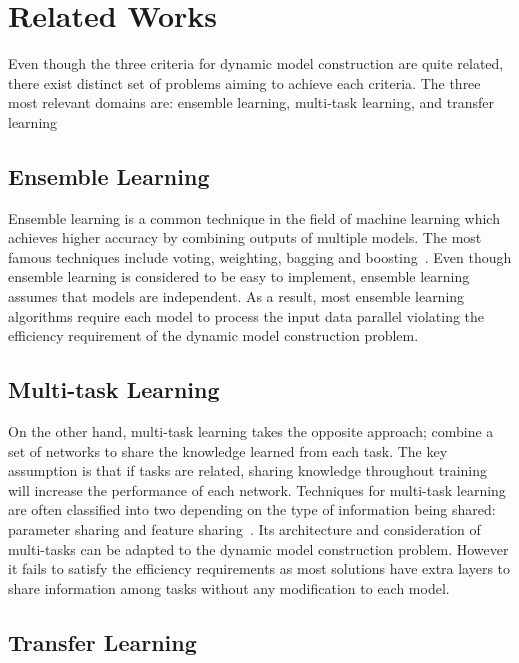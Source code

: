 \documentclass{article}
\begin{document}
\section{Related Works}

Even though the three criteria for dynamic model construction are quite related, there exist distinct set of problems aiming to achieve each criteria. The three most relevant domains are: ensemble learning, multi-task learning, and transfer learning

\subsection{Ensemble Learning}
Ensemble learning is a common technique in the field of machine learning which achieves higher accuracy by combining outputs of multiple models. The most famous techniques include voting, weighting, bagging and boosting~\cite{dietterich2000ensemble, breiman1996bagging, freund1996experiments}. Even though ensemble learning is considered to be easy to implement, ensemble learning assumes that models are independent. As a result, most ensemble learning algorithms require each model to process the input data parallel violating the efficiency requirement of the dynamic model construction problem.

\subsection{Multi-task Learning}
On the other hand, multi-task learning takes the opposite approach; combine a set of networks to share the knowledge learned from each task. The key assumption is that if tasks are related, sharing knowledge throughout training will increase the performance of each network. Techniques for multi-task learning are often classified into two depending on the type of information being shared: parameter sharing and feature sharing~\cite{ruder2017overview, Caruana1993MultitaskLA, duong2015low, lu2017fully}. Its architecture and consideration of multi-tasks can be adapted to the dynamic model construction problem. However it fails to satisfy the efficiency requirements as most solutions have extra layers to share information among tasks without any modification to each model.

\subsection{Transfer Learning}
\end{document}
